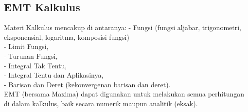 \documentclass[12pt,arial,letterpaper]{book}
\begin{document}
\begin{eulernootebook}
\begin{eulercomment}
\begin{eulercomment}
\begin{eulernootebook}
\begin{eulercomment}
\begin{eulercomment}
\begin{eulercomment}
\begin{eulercomment}
\begin{eulercomment}
\begin{eulercomment}
\chapter{EMT Kalkulus}
\begin{eulernotebook}
\begin{eulercomment}
Materi Kalkulus mencakup di antaranya: - Fungsi (fungsi aljabar,
trigonometri, eksponensial, logaritma, komposisi fungsi)\\
- Limit Fungsi,\\
- Turunan Fungsi,\\
- Integral Tak Tentu,\\
- Integral Tentu dan Aplikasinya,\\
- Barisan dan Deret (kekonvergenan barisan dan deret).\\
EMT (bersama Maxima) dapat digunakan untuk melakukan semua perhitungan
di dalam kalkulus, baik secara numerik maupun analitik (eksak).


\end{eulercomment}
\end{eulernotebook}
\end{eulercomment}
\end{eulercomment}
\end{eulercomment}
\end{eulercomment}
\end{eulercomment}
\end{eulercomment}
\end{eulernootebook}
\end{eulercomment}
\end{eulercomment}
\end{eulernootebook}
\end{document}
